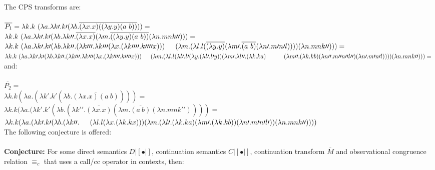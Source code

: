 \documentclass[a4paper,10pt]{article}
\begin{document}
The CPS transforms are:\\
\\
$
 \overline{P_1} =\\
\lambda k . k\ (\lambda a . \lambda k\prime .
k\prime (\lambda b . \overline{(\lambda x . x) ((\lambda y . y) (a\ b))})) =\\
%
$
\\
$\lambda k . k\ (\lambda a . \lambda k\prime .
k\prime (\lambda b .
\lambda k\prime\prime . \overline{(\lambda x . x)} (\lambda m .
\overline{((\lambda y . y) (a\ b))} (\lambda n . m n k\prime\prime))) =\\
$
%
\\
$\lambda k . k\ (\lambda a . \lambda k\prime .
k\prime (\lambda b .
\lambda k\prime\prime . (\lambda k\prime\prime\prime . 
\lambda k\prime\prime\prime (\lambda x . (\lambda k\prime\prime\prime\prime . k\prime\prime\prime\prime x)))\\
\indent (\lambda m .
(\lambda l . l (\overline{(\lambda y . y)} (\lambda m\prime . \overline{(a\ b)}
(\lambda n\prime . m\prime n\prime l))))
(\lambda n . m n k\prime\prime))) =\\
$
%
\\
$
\lambda k . k\ (\lambda a . \lambda k\prime .
k\prime (\lambda b .
\lambda k\prime\prime . (\lambda k\prime\prime\prime . 
\lambda k\prime\prime\prime (\lambda x . (\lambda k\prime\prime\prime\prime . k\prime\prime\prime\prime x)))\\
\indent (\lambda m .
(\lambda l . l (\lambda l\prime . l\prime (\lambda y . (\lambda l\prime . l\prime y))
(\lambda m\prime . \lambda l\prime\prime . (\lambda k . k a)\\
\indent \indent (\lambda m\prime\prime . 
(\lambda k . k b) (\lambda n\prime\prime . m\prime\prime n\prime\prime l\prime\prime)
(\lambda n\prime . m\prime n\prime l))))
(\lambda n . m n k\prime\prime))) =\\
$
\\
and:\\
\\
$
\overline{P_2} =
$
\\
$
\lambda k . k (\lambda a . (\lambda k\prime . k\prime (\lambda b . \overline{(\lambda x . x) (a\ b)})))
=
$
\\
$
\lambda k . k (\lambda a . (\lambda k\prime . k\prime (\lambda b .
(\lambda k\prime\prime . \overline{(\lambda x . x)} (\lambda m . \overline{(a\ b)}
(\lambda n . m n k\prime\prime))))
=
$
\\
$
\lambda k . k (\lambda a . (\lambda k\prime . k\prime (\lambda b .
(\lambda k\prime\prime . \\
\indent (\lambda l . l (\lambda x . (\lambda k . k x))) 
(\lambda m . (\lambda l\prime . (\lambda k . k a) (\lambda m\prime . (\lambda k . k b))
(\lambda n\prime . m\prime n\prime l\prime))
(\lambda n . m n k\prime\prime))))
$
\\
The following conjecture is offered:\\
\\
\textbf{Conjecture:} For some direct semantics $D |[ \bullet |] $, continuation semantics
$C |[ \bullet |]$, continuation transform $\overline{M}$ and observational congruence relation
$\equiv_c$ that uses a call/cc operator in contexts, then:\\
\end{document}
